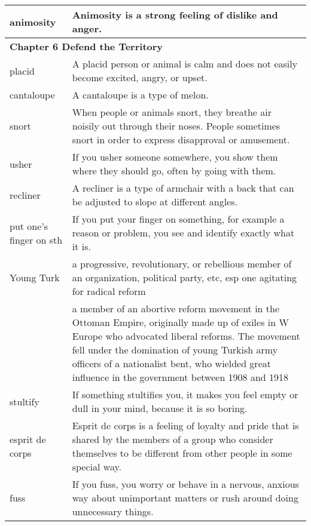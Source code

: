 \documentclass{article}
\begin{document}
\begin{center}
\begin{longtable}{|l|p{9cm}|}
\hline
animosity
&
Animosity is a strong feeling of dislike and anger.
\\

\hline
\multicolumn{2}{|l|}{\textbf{Chapter 6 Defend the Territory}}\\
\hline
placid
&
A placid person or animal is calm and does not easily become excited, angry, or upset.
\\

\hline
cantaloupe
&
A cantaloupe is a type of melon.
\\

\hline
snort
&
When people or animals snort, they breathe air noisily out through their noses. People sometimes snort in order to express disapproval or amusement.
\\

\hline
usher
&
If you usher someone somewhere, you show them where they should go, often by going with them.
\\

\hline
recliner
&
A recliner is a type of armchair with a back that can be adjusted to slope at different angles.
\\

\hline
put one's finger on sth
&
If you put your finger on something, for example a reason or problem, you see and identify exactly what it is.
\\

\hline
Young Turk
&
a progressive, revolutionary, or rebellious member of an organization, political party, etc, esp one agitating for radical reform
\\

&
a member of an abortive reform movement in the Ottoman Empire, originally made up of exiles in W Europe who advocated liberal reforms. The movement fell under the domination of young Turkish army officers of a nationalist bent, who wielded great influence in the government between 1908 and 1918
\\

\hline
stultify
&
If something stultifies you, it makes you feel empty or dull in your mind, because it is so boring.
\\

\hline
esprit de corps
&
Esprit de corps is a feeling of loyalty and pride that is shared by the members of a group who consider themselves to be different from other people in some special way.
\\

\hline
fuss
&
If you fuss, you worry or behave in a nervous, anxious way about unimportant matters or rush around doing unnecessary things.
\\


\end{longtable}
\end{center}
\end{document}
